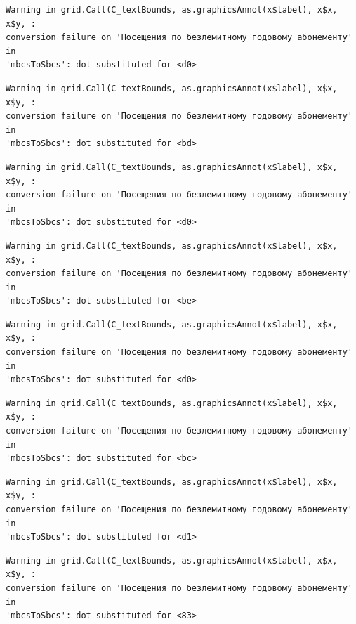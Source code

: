\documentclass[
  letterpaper,
  DIV=11,
  numbers=noendperiod]{scrartcl}
\begin{document}
\begin{verbatim}
Warning in grid.Call(C_textBounds, as.graphicsAnnot(x$label), x$x, x$y, :
conversion failure on 'Посещения по безлемитному годовому абонементу' in
'mbcsToSbcs': dot substituted for <d0>
\end{verbatim}

\begin{verbatim}
Warning in grid.Call(C_textBounds, as.graphicsAnnot(x$label), x$x, x$y, :
conversion failure on 'Посещения по безлемитному годовому абонементу' in
'mbcsToSbcs': dot substituted for <bd>
\end{verbatim}

\begin{verbatim}
Warning in grid.Call(C_textBounds, as.graphicsAnnot(x$label), x$x, x$y, :
conversion failure on 'Посещения по безлемитному годовому абонементу' in
'mbcsToSbcs': dot substituted for <d0>
\end{verbatim}

\begin{verbatim}
Warning in grid.Call(C_textBounds, as.graphicsAnnot(x$label), x$x, x$y, :
conversion failure on 'Посещения по безлемитному годовому абонементу' in
'mbcsToSbcs': dot substituted for <be>
\end{verbatim}

\begin{verbatim}
Warning in grid.Call(C_textBounds, as.graphicsAnnot(x$label), x$x, x$y, :
conversion failure on 'Посещения по безлемитному годовому абонементу' in
'mbcsToSbcs': dot substituted for <d0>
\end{verbatim}

\begin{verbatim}
Warning in grid.Call(C_textBounds, as.graphicsAnnot(x$label), x$x, x$y, :
conversion failure on 'Посещения по безлемитному годовому абонементу' in
'mbcsToSbcs': dot substituted for <bc>
\end{verbatim}

\begin{verbatim}
Warning in grid.Call(C_textBounds, as.graphicsAnnot(x$label), x$x, x$y, :
conversion failure on 'Посещения по безлемитному годовому абонементу' in
'mbcsToSbcs': dot substituted for <d1>
\end{verbatim}

\begin{verbatim}
Warning in grid.Call(C_textBounds, as.graphicsAnnot(x$label), x$x, x$y, :
conversion failure on 'Посещения по безлемитному годовому абонементу' in
'mbcsToSbcs': dot substituted for <83>
\end{verbatim}
\end{document}
